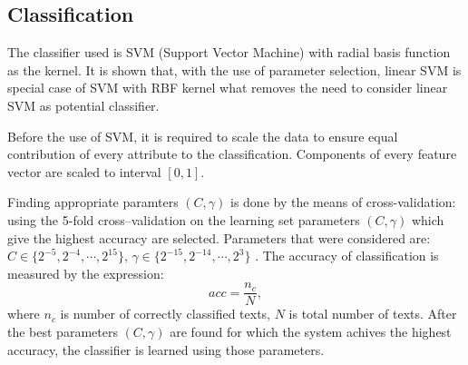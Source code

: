 \documentclass[11pt,english]{article}
\begin{document}
\begin{multicols}{2}

\section{Classification}
The classifier used is SVM (Support Vector Machine) with radial basis
function as the kernel. It is shown that, with the use of parameter selection,
linear SVM is special case of SVM with RBF kernel \citep{keerthi2003asymptotic}
what removes the need to consider linear SVM as potential classifier.

Before the use of SVM, it is required to scale the data to ensure
equal contribution of every attribute to the classification. Components of
every feature vector are scaled to interval $[0, 1]$.

Finding appropriate paramters $(C, \gamma)$ is done by the means of
cross-validation: using the 5-fold cross--validation on the
learning set parameters $(C, \gamma)$ which give the highest accuracy are
selected. Parameters that were considered are: $C \in \{2^{-5}, 2^{-4}, \cdots ,
2^{15}\}$, $\gamma \in \{2^{-15}, 2^{-14}, \cdots, 2^3\}$ \citep{CC01a}.
The accuracy of classification is measured by the expression:
\begin{equation}
acc = \frac{n_c}{N}, %
\end{equation}
where $n_c$ is number of correctly classified texts, $N$ is total number of
texts. After the best parameters  $(C, \gamma)$ are found for
which the system achives the highest accuracy, the classifier is learned using
those parameters.


\end{multicols}
\end{document}

